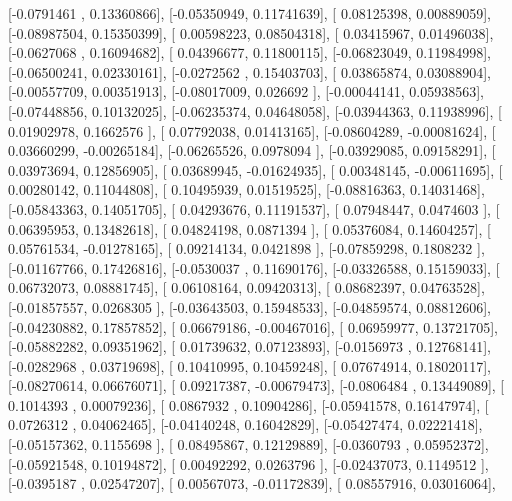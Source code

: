 \documentclass{article}
\begin{document}
       [-0.0791461 ,  0.13360866],
       [-0.05350949,  0.11741639],
       [ 0.08125398,  0.00889059],
       [-0.08987504,  0.15350399],
       [ 0.00598223,  0.08504318],
       [ 0.03415967,  0.01496038],
       [-0.0627068 ,  0.16094682],
       [ 0.04396677,  0.11800115],
       [-0.06823049,  0.11984998],
       [-0.06500241,  0.02330161],
       [-0.0272562 ,  0.15403703],
       [ 0.03865874,  0.03088904],
       [-0.00557709,  0.00351913],
       [-0.08017009,  0.026692  ],
       [-0.00044141,  0.05938563],
       [-0.07448856,  0.10132025],
       [-0.06235374,  0.04648058],
       [-0.03944363,  0.11938996],
       [ 0.01902978,  0.1662576 ],
       [ 0.07792038,  0.01413165],
       [-0.08604289, -0.00081624],
       [ 0.03660299, -0.00265184],
       [-0.06265526,  0.0978094 ],
       [-0.03929085,  0.09158291],
       [ 0.03973694,  0.12856905],
       [ 0.03689945, -0.01624935],
       [ 0.00348145, -0.00611695],
       [ 0.00280142,  0.11044808],
       [ 0.10495939,  0.01519525],
       [-0.08816363,  0.14031468],
       [-0.05843363,  0.14051705],
       [ 0.04293676,  0.11191537],
       [ 0.07948447,  0.0474603 ],
       [ 0.06395953,  0.13482618],
       [ 0.04824198,  0.0871394 ],
       [ 0.05376084,  0.14604257],
       [ 0.05761534, -0.01278165],
       [ 0.09214134,  0.0421898 ],
       [-0.07859298,  0.1808232 ],
       [-0.01167766,  0.17426816],
       [-0.0530037 ,  0.11690176],
       [-0.03326588,  0.15159033],
       [ 0.06732073,  0.08881745],
       [ 0.06108164,  0.09420313],
       [ 0.08682397,  0.04763528],
       [-0.01857557,  0.0268305 ],
       [-0.03643503,  0.15948533],
       [-0.04859574,  0.08812606],
       [-0.04230882,  0.17857852],
       [ 0.06679186, -0.00467016],
       [ 0.06959977,  0.13721705],
       [-0.05882282,  0.09351962],
       [ 0.01739632,  0.07123893],
       [-0.0156973 ,  0.12768141],
       [-0.0282968 ,  0.03719698],
       [ 0.10410995,  0.10459248],
       [ 0.07674914,  0.18020117],
       [-0.08270614,  0.06676071],
       [ 0.09217387, -0.00679473],
       [-0.0806484 ,  0.13449089],
       [ 0.1014393 ,  0.00079236],
       [ 0.0867932 ,  0.10904286],
       [-0.05941578,  0.16147974],
       [ 0.0726312 ,  0.04062465],
       [-0.04140248,  0.16042829],
       [-0.05427474,  0.02221418],
       [-0.05157362,  0.1155698 ],
       [ 0.08495867,  0.12129889],
       [-0.0360793 ,  0.05952372],
       [-0.05921548,  0.10194872],
       [ 0.00492292,  0.0263796 ],
       [-0.02437073,  0.1149512 ],
       [-0.0395187 ,  0.02547207],
       [ 0.00567073, -0.01172839],
       [ 0.08557916,  0.03016064],
\end{document}

